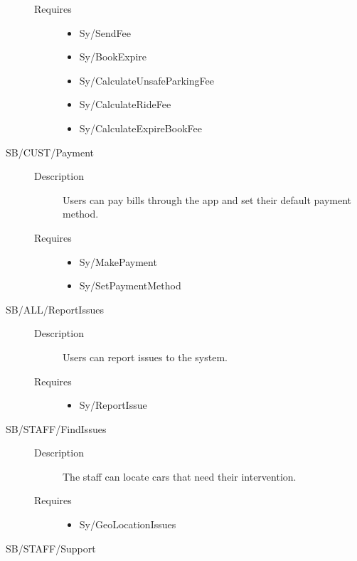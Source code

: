\documentclass[11pt]{article} %
\begin{document}
\begin{description}
\begin{description}
		\item[Requires] \hfill
		\begin{itemize}
			\item Sy/SendFee %
			\item Sy/BookExpire %
			\item Sy/CalculateUnsafeParkingFee %
			\item Sy/CalculateRideFee 
			\item Sy/CalculateExpireBookFee
		\end{itemize}
	\end{description}
	\item[SB/CUST/Payment] \hfill
	\begin{description}
		\item[Description] Users can pay bills through the app and set their default payment method.
		\item[Requires] \hfill
		\begin{itemize}
			\item Sy/MakePayment %
			\item Sy/SetPaymentMethod %
		\end{itemize}
	\end{description}
	\item[SB/ALL/ReportIssues] \hfill
	\begin{description}
		\item[Description] Users can report issues to the system.
		\item[Requires] \hfill
		\begin{itemize}
			\item Sy/ReportIssue %
		\end{itemize}
	\end{description}
	\item[SB/STAFF/FindIssues] \hfill
	\begin{description}
		\item[Description] The staff can locate cars that need their intervention.
		\item[Requires] \hfill
		\begin{itemize}
			\item Sy/GeoLocationIssues %
		\end{itemize}
	\end{description}
	\item[SB/STAFF/Support] \hfill

\end{description}
\end{document}

